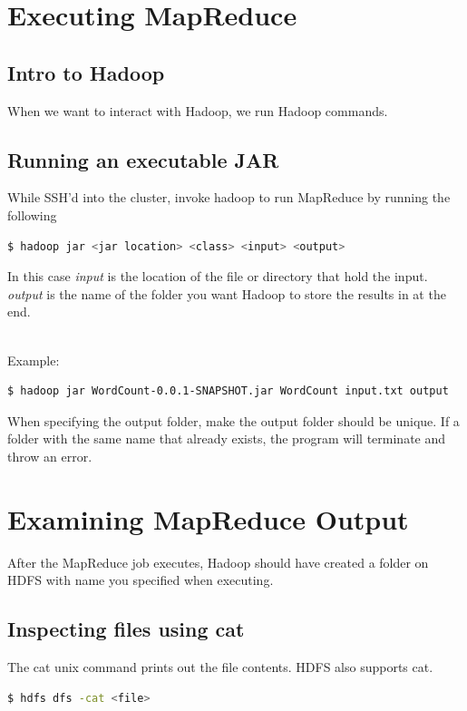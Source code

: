 \documentclass{article}
\begin{document}
\section{Executing MapReduce}
\subsection{Intro to Hadoop}
When we want to interact with Hadoop, we run Hadoop commands.
\subsection{Running an executable JAR}
While SSH'd into the cluster, invoke hadoop to run MapReduce by running the following
\begin{lstlisting}[language=bash]
  $ hadoop jar <jar location> <class> <input> <output>
\end{lstlisting}
In this case \emph{input} is the location of the file or directory that hold the input. \emph{output} is the name of the folder you want Hadoop to store the results in at the end.

\-\\\noindent Example:
\begin{lstlisting}[language=bash]
  $ hadoop jar WordCount-0.0.1-SNAPSHOT.jar WordCount input.txt output
\end{lstlisting}
\begin{info}
When specifying the output folder, make the output folder should be unique. If a folder with the same name that already exists, the program will terminate and throw an error. 
\end{info}

\section{Examining MapReduce Output}
After the MapReduce job executes, Hadoop should have created a folder on HDFS with name you specified when executing. 

\subsection{Inspecting files using cat}
The cat unix command prints out the file contents. HDFS also supports cat.
\begin{lstlisting}[language=bash]
  $ hdfs dfs -cat <file>
\end{lstlisting}
\end{document}
